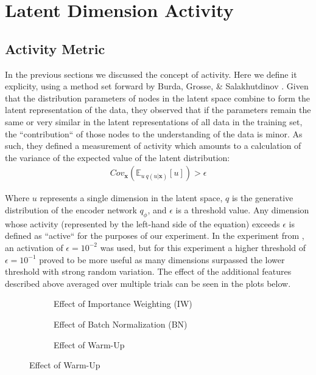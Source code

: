 \documentclass{article} %
\numberwithin{figure}{section}
\begin{document}
\section{Latent Dimension Activity}
\subsection{Activity Metric}
In the previous sections we discussed the concept of activity. Here we define it explicity, using a method set forward by Burda, Grosse, \& Salakhutdinov \cite{Burda2016}. Given that the distribution parameters of nodes in the latent space combine to form the latent representation of the data, they observed that if the parameters remain the same or very similar in the latent representations of all data in the training set, the ``contribution`` of those nodes to the understanding of the data is minor. As such, they defined a measurement of activity which amounts to a calculation of the variance of the expected value of the latent distribution:
\begin{align}
  Cov_{\textbf{x}}\left(\mathbb{E}_{u~q(u|\textbf{x})}[u]\right)>\epsilon
  \label{eq:ACTIVITYMET}
\end{align}
\par Where $u$ represents a single dimension in the latent space, $q$ is the generative distribution of the encoder network $q_\phi$, and $\epsilon$ is a threshold value. Any dimension whose activity (represented by the left-hand side of the equation) exceeds $\epsilon$ is defined as ``active`` for the purposes of our experiment. In the experiment from \cite{Burda2016}, an activation of $\epsilon=10^{-2}$ was used, but for this experiment a higher threshold of $\epsilon=10^{-1}$ proved to be more useful as many dimensions surpassed the lower threshold with strong random variation. The effect of the additional features described above averaged over multiple trials can be seen in the plots below.
\begin{figure}[h]
  \centering
  \begin{subfigure}[t]{0.3\textwidth}
    \resizebox{\linewidth}{!}{}
    \caption{Effect of Importance Weighting (IW)}
    \label{fig:iwlat}
  \end{subfigure}
  \begin{subfigure}[t]{0.3\textwidth}
    \resizebox{\linewidth}{!}{}
    \caption{Effect of Batch Normalization (BN)}
    \label{fig:bnlat}
  \end{subfigure}
  \begin{subfigure}[t]{0.3\textwidth}
    \resizebox{\linewidth}{!}{}
    \caption{Effect of Warm-Up}
    \label{fig:wulat}
  \end{subfigure}
\end{figure}
\end{document}
